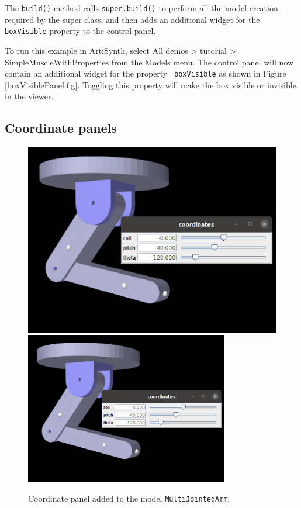 The {\tt build()} method calls {\tt super.build()} to perform all the
model creation required by the super class, and then adds an
additional widget for the {\tt boxVisible} property to the control
panel.

To run this example in ArtiSynth, select {\sf All demos > tutorial >
SimpleMuscleWithProperties} from the {\sf Models} menu. The control
panel will now contain an additional widget for the property {\tt
boxVisible} as shown in Figure \ref{boxVisiblePanel:fig}. Toggling
this property will make the box visible or invisible in the viewer.

\subsection{Coordinate panels}
\label{CoordinatePanels:sec}

\begin{figure}[ht]
\begin{center}
\iflatexml
 \includegraphics[]{images/CoordinatePanel}
\else
 \includegraphics[width=3.5in]{images/CoordinatePanel}
\fi
\end{center}
\caption{Coordinate panel added to the model {\tt MultiJointedArm}.}
\label{CoordinatePanel:fig}
\end{figure}

